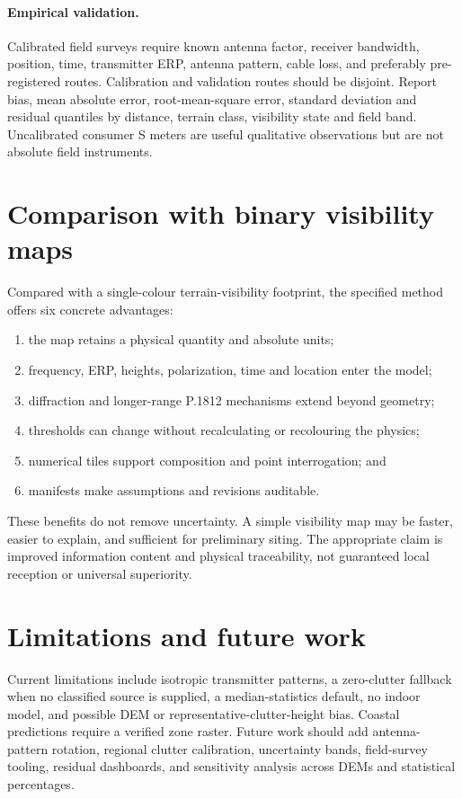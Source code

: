 \documentclass[10pt,a4paper,twocolumn]{article}
\begin{document}
\paragraph{Empirical validation.}
Calibrated field surveys require known antenna factor, receiver bandwidth,
position, time, transmitter ERP, antenna pattern, cable loss, and preferably
pre-registered routes. Calibration and validation routes should be disjoint.
Report bias, mean absolute error, root-mean-square error, standard deviation and
residual quantiles by distance, terrain class, visibility state and field band.
Uncalibrated consumer S meters are useful qualitative observations but are not
absolute field instruments.

\section{Comparison with binary visibility maps}

Compared with a single-colour terrain-visibility footprint, the specified
method offers six concrete advantages:

\begin{enumerate}
\item the map retains a physical quantity and absolute units;
\item frequency, ERP, heights, polarization, time and location enter the model;
\item diffraction and longer-range P.1812 mechanisms extend beyond geometry;
\item thresholds can change without recalculating or recolouring the physics;
\item numerical tiles support composition and point interrogation; and
\item manifests make assumptions and revisions auditable.
\end{enumerate}

These benefits do not remove uncertainty. A simple visibility map may be faster,
easier to explain, and sufficient for preliminary siting. The appropriate claim
is improved information content and physical traceability, not guaranteed local
reception or universal superiority.

\section{Limitations and future work}

Current limitations include isotropic transmitter patterns, a zero-clutter
fallback when no classified source is supplied, a median-statistics default,
no indoor model, and possible DEM or representative-clutter-height bias.
Coastal predictions require a verified zone raster. Future work should add
antenna-pattern rotation, regional clutter calibration, uncertainty bands,
field-survey tooling, residual dashboards, and sensitivity analysis across
DEMs and statistical percentages.
\end{document}
